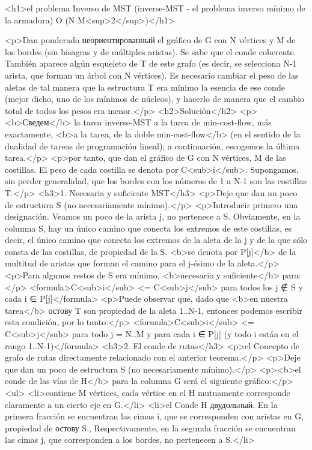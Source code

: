 <h1>el problema Inverso de MST (inverse-MST - el problema inverso mínimo de la armadura) O (N M<sup>2</sup>)</h1>

<p>Dan ponderado неориентированный el gráfico de G con N vértices y M de los bordes (sin bisagras y de múltiples aristas). Se sabe que el conde coherente. También aparece algún esqueleto de T de este grafo (es decir, se selecciona N-1 arista, que forman un árbol con N vértices). Es necesario cambiar el peso de las aletas de tal manera que la estructura T era mínimo la esencia de ese conde (mejor dicho, uno de los mínimos de núcleos), y hacerlo de manera que el cambio total de todos los pesos era menor.</p>
<h2>Solución</h2>
<p><b>Сведем</b> la tarea inverse-MST a la tarea de min-cost-flow, más exactamente, <b>a la tarea, de la doble min-cost-flow</b> (en el sentido de la dualidad de tareas de programación lineal); a continuación, escogemos la última tarea.</p>
<p>por tanto, que dan el gráfico de G con N vértices, M de las costillas. El peso de cada costilla se denota por C<sub>i</sub>. Supongamos, sin perder generalidad, que los bordes con los números de 1 a N-1 son las costillas T.</p>
<h3>1. Necesaria y suficiente MST</h3>
<p>Deje que dan un poco de estructura S (no necesariamente mínimo).</p>
<p>Introducir primero una designación. Veamos un poco de la arista j, no pertenece a S. Obviamente, en la columna S, hay un único camino que conecta los extremos de este costillas, es decir, el único camino que conecta los extremos de la aleta de la j y de la que sólo consta de las costillas, de propiedad de la S. <b>se denota por P[j]</b> de la multitud de aristas que forman el camino para el j-ésimo de la aleta.</p>
<p>Para algunos restos de S era mínimo, <b>necesario y suficiente</b> para:</p>
<formula>C<sub>i</sub> <= C<sub>j</sub> para todos los j ∉ S y cada i ∈ P[j]</formula>
<p>Puede observar que, dado que <b>en nuestra tarea</b> остову T son propiedad de la aleta 1..N-1, entonces podemos escribir esta condición, por lo tanto:</p>
<formula>C<sub>i</sub> <= C<sub>j</sub> para todo j = N..M y para cada i ∈ P[j]
(y todo i están en el rango 1..N-1)</formula>
<h3>2. El conde de rutas</h3>
<p>el Concepto de grafo de rutas directamente relacionado con el anterior teorema.</p>
<p>Deje que dan un poco de estructura S (no necesariamente mínimo).</p>
<p><b>el conde de las vías de H</b> para la columna G será el siguiente gráfico:</p>
<ul>
<li>contiene M vértices, cada vértice en el H mutuamente corresponde claramente a un cierto eje en G.</li>
<li>el Conde H двудольный. En la primera fracción se encuentran las cimas i, que se corresponden con aristas en G, propiedad de остову S., Respectivamente, en la segunda fracción se encuentran las cimas j, que corresponden a los bordes, no pertenecen a S.</li>
